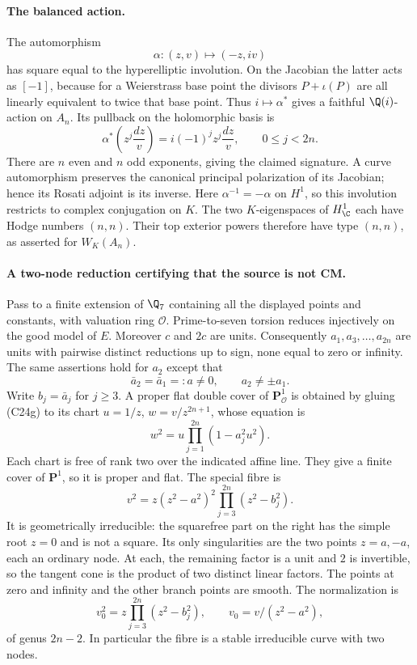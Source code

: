 \paragraph{The balanced action.}
The automorphism
\[
 \alpha:(z,v)\longmapsto(-z,iv)
\]
has square equal to the hyperelliptic involution. On the
Jacobian the latter acts as $[-1]$, because for a Weierstrass
base point the divisors $P+\iota(P)$ are all linearly equivalent
to twice that base point. Thus $i\mapsto\alpha^*$ gives
a faithful $\Q(i)$-action on $A_n$. Its pullback on the
holomorphic basis is
\[
 \alpha^*\left(z^j\frac{dz}{v}\right)
   =i(-1)^j z^j\frac{dz}{v},\qquad 0\leq j<2n.
\]
There are $n$ even and $n$ odd exponents, giving the claimed
signature. A curve automorphism preserves the canonical
principal polarization of its Jacobian; hence its Rosati
adjoint is its inverse. Here $\alpha^{-1}=-\alpha$ on
$H^1$, so this involution restricts to complex conjugation
on $K$. The two $K$-eigenspaces of $H^1_\C$ each have
Hodge numbers $(n,n)$. Their top exterior powers therefore
have type $(n,n)$, as asserted for $W_K(A_n)$.

\paragraph{A two-node reduction certifying that the source is not CM.}
Pass to a finite extension of $\Q_7$ containing all the
displayed points and constants, with valuation ring $\mathcal O$.
Prime-to-seven torsion reduces injectively on the good model
of $E$. Moreover $c$ and $2c$ are units. Consequently
$a_1,a_3,\ldots,a_{2n}$ are units with pairwise distinct
reductions up to sign, none equal to zero or infinity.
The same assertions hold for $a_2$ except that
\[
 \bar a_2=\bar a_1=:a\ne0,\qquad a_2\ne\pm a_1.
\]
Write $b_j=\bar a_j$ for $j\geq3$. A proper flat double
cover of $\mathbf P^1_{\mathcal O}$ is obtained by gluing
(C24g) to its chart $u=1/z$, $w=v/z^{2n+1}$, whose equation is
\[
 w^2=u\prod_{j=1}^{2n}(1-a_j^2u^2).
\]
Each chart is free of rank two over the indicated affine
line. They give a finite cover of $\mathbf P^1$, so it is
proper and flat. The special fibre is
\[
 v^2=z(z^2-a^2)^2\prod_{j=3}^{2n}(z^2-b_j^2).
 \tag{C24h}
\]
It is geometrically irreducible: the squarefree part on the
right has the simple root $z=0$ and is not a square.
Its only singularities are the two points $z=a,-a$, each
an ordinary node. At each, the remaining factor is a unit
and $2$ is invertible, so the tangent cone is the product
of two distinct linear factors. The points at zero and
infinity and the other branch points are smooth.
The normalization is
\[
 v_0^2=z\prod_{j=3}^{2n}(z^2-b_j^2),
 \qquad v_0=v/(z^2-a^2),
\]
of genus $2n-2$. In particular the fibre is a stable
irreducible curve with two nodes.

